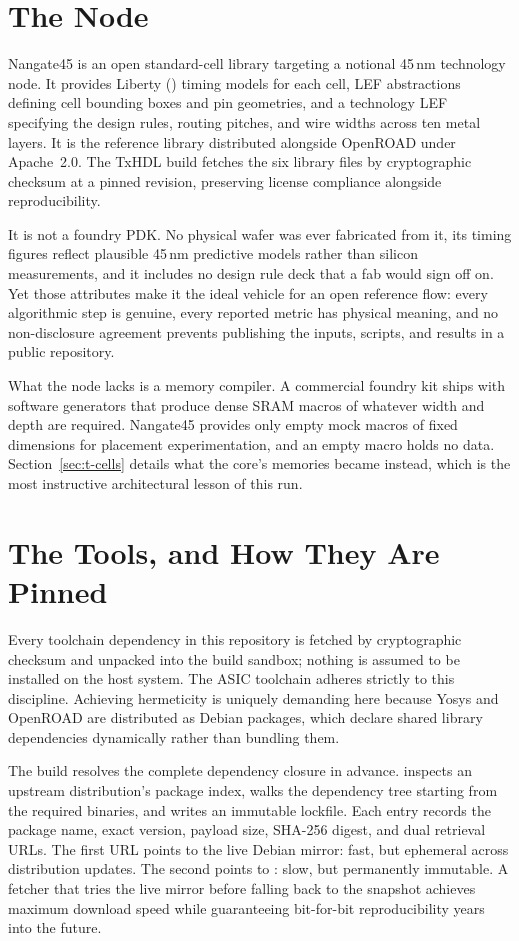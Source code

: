 \documentclass[journal,9pt]{IEEEtran}
\begin{document}
\section{The Node}
\label{sec:t-node}

Nangate45 is an open standard-cell library targeting a notional 45\,nm
technology node. It provides Liberty () timing models for
each cell, LEF abstractions defining cell bounding boxes and pin
geometries, and a technology LEF specifying the design rules, routing
pitches, and wire widths across ten metal layers. It is the reference
library distributed alongside OpenROAD under Apache~2.0. The TxHDL build
fetches the six library files by cryptographic checksum at a pinned
revision, preserving license compliance alongside reproducibility.

It is not a foundry PDK. No physical wafer was ever fabricated from it,
its timing figures reflect plausible 45\,nm predictive models rather
than silicon measurements, and it includes no design rule deck that a fab
would sign off on. Yet those attributes make it the ideal vehicle for an
open reference flow: every algorithmic step is genuine, every reported
metric has physical meaning, and no non-disclosure agreement prevents
publishing the inputs, scripts, and results in a public repository.

What the node lacks is a memory compiler. A commercial foundry kit ships
with software generators that produce dense SRAM macros of whatever width
and depth are required. Nangate45 provides only empty mock macros of
fixed dimensions for placement experimentation, and an empty macro holds
no data. Section~\ref{sec:t-cells} details what the core's memories
became instead, which is the most instructive architectural lesson of
this run.

\section{The Tools, and How They Are Pinned}
\label{sec:t-tools}

Every toolchain dependency in this repository is fetched by cryptographic
checksum and unpacked into the build sandbox; nothing is assumed to be
installed on the host system. The ASIC toolchain adheres strictly to this
discipline. Achieving hermeticity is uniquely demanding here because
Yosys and OpenROAD are distributed as Debian packages, which declare
shared library dependencies dynamically rather than bundling them.

The build resolves the complete dependency closure in advance.
 inspects an upstream distribution's package
index, walks the dependency tree starting from the required binaries,
and writes an immutable lockfile. Each entry records the package name,
exact version, payload size, SHA-256 digest, and dual retrieval URLs.
The first URL points to the live Debian mirror: fast, but ephemeral across
distribution updates. The second points to : slow,
but permanently immutable. A fetcher that tries the live mirror before
falling back to the snapshot achieves maximum download speed while
guaranteeing bit-for-bit reproducibility years into the future.
\end{document}
